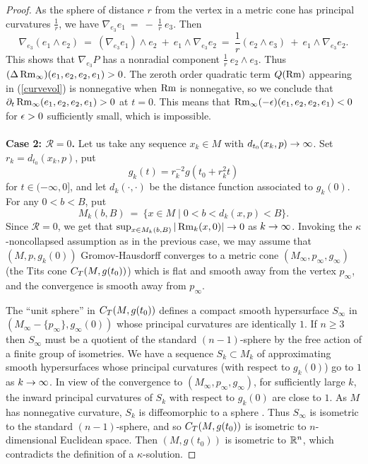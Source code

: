 \begin{proof}
As the sphere of distance $r$ from the vertex in a metric cone has
principal curvatures $\frac{1}{r}$, we have
$\nabla_{e_3} e_1 \: = \: - \: \frac{1}{r} \: e_3$.
Then
\begin{equation}
\nabla_{e_3} (e_1 \wedge e_2) \: = \:
\left( \nabla_{e_3} e_1 \right) \wedge e_2 \: + \:
e_1 \wedge \nabla_{e_3} e_2 \: = \: \frac{1}{r} \left( e_2 \wedge e_3 \right) \: + \:
e_1 \wedge \nabla_{e_3} e_2.
\end{equation}
This shows that $\nabla_{e_3} P$ has a nonradial component
$\frac{1}{r} \: e_2 \wedge e_3$. Thus
$(\Delta \operatorname{Rm}_\infty)(e_1,e_2,e_2,e_1)>0$.
The zeroth order quadratic term $Q(\operatorname{Rm})$ appearing in (\ref{curvevol})
is nonnegative when $\operatorname{Rm}$ is nonnegative, so we conclude that
$\partial_t\operatorname{Rm}_\infty(e_1,e_2,e_2,e_1)>0$ at $t=0$.  This means that
$\operatorname{Rm}_\infty(-\epsilon)(e_1,e_2,e_2,e_1)<0$ for $\epsilon>0$ sufficiently small,
which is impossible. \\ \\
{\bf Case 2: ${\mathcal R}=0$.}
Let us take any sequence $x_k\in M$ with
$d_{t_0}(x_k,p)\rightarrow \infty$.  Set $r_k = d_{t_0}(x_k,p)$, put
\begin{equation}
g_k(t) =  r_k^{-2}g(t_0 + r_k^2 t)
\end{equation}
for $t\in (-\infty,0]$, and let $d_k(\cdot, \cdot)$ be the distance function
associated to $g_k(0)$.
For any $0<b<B$, put
\begin{equation}
M_k(b,B) \: = \: \{x\in M\mid 0<b<d_k(x,p)<B\}.
\end{equation}
Since ${\mathcal R}=0$, we get that $\sup_{x\in M_k(b,B)}|\operatorname{Rm}_k(x,0)|\rightarrow 0$
as $k\rightarrow\infty$.  Invoking the $\kappa$-noncollapsed assumption as in
the previous case, we
may assume that $(M,p,g_k(0))$ Gromov-Hausdorff converges to a metric
cone $(M_\infty,p_\infty,g_\infty)$ (the Tits cone $C_T(M,g(t_0))$)
which is flat and smooth away from the
vertex $p_\infty$, and the convergence is smooth away from $p_\infty$.

The ``unit sphere'' in $C_T(M,g(t_0))$
defines a compact smooth hypersurface $S_\infty$
in $(M_\infty - \{p_\infty\},g_\infty(0))$ whose principal curvatures
are identically $1$. If $n \ge 3$ then $S_\infty$ must be a quotient of
the standard $(n-1)$-sphere by the free action of a finite group of
isometries. We have a sequence $S_k\subset M_k$
of approximating smooth hypersurfaces whose principal curvatures
(with respect to $g_k(0)$) go to $1$ as $k\rightarrow\infty$.  In view of the
convergence to $(M_\infty,p_\infty,g_\infty)$, for
sufficiently large $k$,
the inward principal curvatures of $S_k$ with respect to $g_k(0)$
are close to $1$. As $M$ has nonnegative curvature,
$S_k$ is diffeomorphic to a sphere \cite[Theorem A]{Eschenburg}.
Thus $S_\infty$ is isometric to the standard $(n-1)$-sphere,
and so
$C_T(M,g(t_0))$ is isometric to $n$-dimensional Euclidean space.
Then  $(M,g(t_0))$ is isometric to ${\mathbb R}^n$, which
contradicts the definition of a $\kappa$-solution.


\end{proof}
